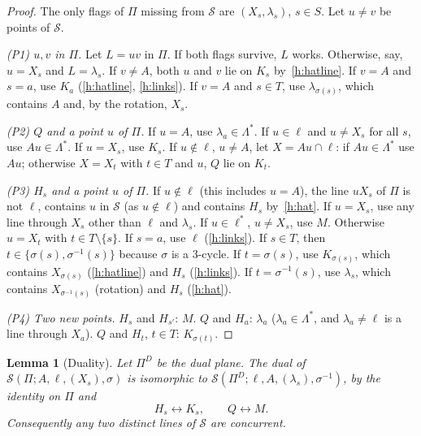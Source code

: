 \documentclass[11pt]{amsart}
\newtheorem{lemma}[theorem]{Lemma}
\theoremstyle{definition}
\theoremstyle{remark}
\newcommand{\cS}{\mathcal{S}}
\newcommand{\lam}{\lambda}
\begin{document}
\begin{proof}
The only flags of $\Pi$ missing from $\cS$ are $(X_s,\lam_s)$, $s\in S$. Let $u\ne v$ be points of $\cS$.

\emph{(P1) $u,v$ in $\Pi$.} Let $L=uv$ in $\Pi$. If both flags survive, $L$ works. Otherwise, say, $u=X_s$ and $L=\lam_s$. If $v\ne A$, both $u$ and $v$ lie on $K_s$ by~\ref{h:hatline}. If $v=A$ and $s=a$, use $K_a$ (\ref{h:hatline}, \ref{h:links}). If $v=A$ and $s\in T$, use $\lam_{\sigma(s)}$, which contains $A$ and, by the rotation, $X_s$.

\emph{(P2) $Q$ and a point $u$ of $\Pi$.} If $u=A$, use $\lam_a\in\Lambda^*$. If $u\in\ell$ and $u\ne X_s$ for all $s$, use $Au\in\Lambda^*$. If $u=X_s$, use $K_s$. If $u\notin\ell$, $u\ne A$, let $X=Au\cap\ell$: if $Au\in\Lambda^*$ use $Au$; otherwise $X=X_t$ with $t\in T$ and $u$, $Q$ lie on $K_t$.

\emph{(P3) $H_s$ and a point $u$ of $\Pi$.} If $u\notin\ell$ (this includes $u=A$), the line $uX_s$ of $\Pi$ is not $\ell$, contains $u$ in $\cS$ (as $u\notin\ell$) and contains $H_s$ by~\ref{h:hat}. If $u=X_s$, use any line through $X_s$ other than $\ell$ and $\lam_s$. If $u\in\ell^*$, $u\ne X_s$, use $M$. Otherwise $u=X_t$ with $t\in T\setminus\{s\}$. If $s=a$, use $\ell$ (\ref{h:links}). If $s\in T$, then $t\in\{\sigma(s),\sigma^{-1}(s)\}$ because $\sigma$ is a $3$-cycle. If $t=\sigma(s)$, use $K_{\sigma(s)}$, which contains $X_{\sigma(s)}$ (\ref{h:hatline}) and $H_s$ (\ref{h:links}). If $t=\sigma^{-1}(s)$, use $\lam_s$, which contains $X_{\sigma^{-1}(s)}$ (rotation) and $H_s$ (\ref{h:hat}).

\emph{(P4) Two new points.} $H_s$ and $H_{s'}$: $M$. $Q$ and $H_a$: $\lam_a$ ($\lam_a\in\Lambda^*$, and $\lam_a\ne\ell$ is a line through $X_a$). $Q$ and $H_t$, $t\in T$: $K_{\sigma(t)}$.
\end{proof}

\begin{lemma}[Duality]\label{lem:fh-dual}
Let $\Pi^D$ be the dual plane. The dual of $\cS(\Pi;A,\ell,(X_s),\sigma)$ is isomorphic to $\cS(\Pi^D;\ell,A,(\lam_s),\sigma^{-1})$, by the identity on $\Pi$ and
\[
H_s\leftrightarrow K_s,\qquad Q\leftrightarrow M .
\]
Consequently any two distinct lines of $\cS$ are concurrent.
\end{lemma}
\end{document}
